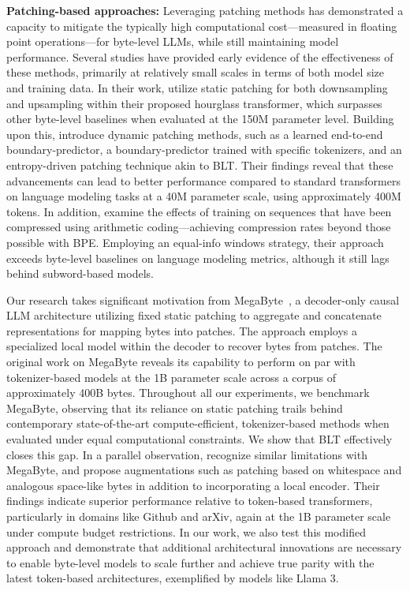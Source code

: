 \textbf{Patching-based approaches:} Leveraging patching methods has demonstrated a capacity to mitigate the typically high computational cost—measured in floating point operations—for byte-level LLMs, while still maintaining model performance. Several studies have provided early evidence of the effectiveness of these methods, primarily at relatively small scales in terms of both model size and training data. In their work, \cite{nawrot-etal-2022-hierarchical} utilize static patching for both downsampling and upsampling within their proposed hourglass transformer, which surpasses other byte-level baselines when evaluated at the 150M parameter level. Building upon this, \cite{nawrot-etal-2023-efficient} introduce dynamic patching methods, such as a learned end-to-end boundary-predictor, a boundary-predictor trained with specific tokenizers, and an entropy-driven patching technique akin to {\textsc BLT}. Their findings reveal that these advancements can lead to better performance compared to standard transformers on language modeling tasks at a 40M parameter scale, using approximately 400M tokens. In addition, \cite{lester2024training} examine the effects of training on sequences that have been compressed using arithmetic coding—achieving compression rates beyond those possible with BPE. Employing an equal-info windows strategy, their approach exceeds byte-level baselines on language modeling metrics, although it still lags behind subword-based models.

Our research takes significant motivation from MegaByte~\citep{yu2023megabyte}, a decoder-only causal LLM architecture utilizing fixed static patching to aggregate and concatenate representations for mapping bytes into patches. The approach employs a specialized local model within the decoder to recover bytes from patches. The original work on MegaByte reveals its capability to perform on par with tokenizer-based models at the 1B parameter scale across a corpus of approximately 400B bytes. Throughout all our experiments, we benchmark MegaByte, observing that its reliance on static patching trails behind contemporary state-of-the-art compute-efficient, tokenizer-based methods when evaluated under equal computational constraints. We show that {\textsc BLT} effectively closes this gap. In a parallel observation, \cite{slagle2024spacebyte} recognize similar limitations with MegaByte, and propose augmentations such as patching based on whitespace and analogous space-like bytes in addition to incorporating a local encoder. Their findings indicate superior performance relative to token-based transformers, particularly in domains like Github and arXiv, again at the 1B parameter scale under compute budget restrictions. In our work, we also test this modified approach and demonstrate that additional architectural innovations are necessary to enable byte-level models to scale further and achieve true parity with the latest token-based architectures, exemplified by models like Llama 3.


